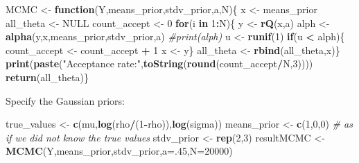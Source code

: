 \documentclass[
  12pt,
]{book}
\newenvironment{Shaded}{\begin{snugshade}}{\end{snugshade}}
\newcommand{\AttributeTok}[1]{\textcolor[rgb]{0.13,0.29,0.53}{#1}}
\newcommand{\CommentTok}[1]{\textcolor[rgb]{0.56,0.35,0.01}{\textit{#1}}}
\newcommand{\ConstantTok}[1]{\textcolor[rgb]{0.56,0.35,0.01}{#1}}
\newcommand{\ControlFlowTok}[1]{\textcolor[rgb]{0.13,0.29,0.53}{\textbf{#1}}}
\newcommand{\DecValTok}[1]{\textcolor[rgb]{0.00,0.00,0.81}{#1}}
\newcommand{\FunctionTok}[1]{\textcolor[rgb]{0.13,0.29,0.53}{\textbf{#1}}}
\newcommand{\NormalTok}[1]{#1}
\newcommand{\OtherTok}[1]{\textcolor[rgb]{0.56,0.35,0.01}{#1}}
\newcommand{\SpecialCharTok}[1]{\textcolor[rgb]{0.81,0.36,0.00}{\textbf{#1}}}
\newcommand{\StringTok}[1]{\textcolor[rgb]{0.31,0.60,0.02}{#1}}
\theoremstyle{definition}
\theoremstyle{definition}
\theoremstyle{definition}
\theoremstyle{definition}
\theoremstyle{remark}
\begin{document}
\begin{Shaded}
\begin{Highlighting}[]
\NormalTok{MCMC }\OtherTok{\textless{}{-}} \ControlFlowTok{function}\NormalTok{(Y,means\_prior,stdv\_prior,a,N)\{}
\NormalTok{  x }\OtherTok{\textless{}{-}}\NormalTok{ means\_prior}
\NormalTok{  all\_theta }\OtherTok{\textless{}{-}} \ConstantTok{NULL}
\NormalTok{  count\_accept }\OtherTok{\textless{}{-}} \DecValTok{0}
  \ControlFlowTok{for}\NormalTok{(i }\ControlFlowTok{in} \DecValTok{1}\SpecialCharTok{:}\NormalTok{N)\{}
\NormalTok{    y }\OtherTok{\textless{}{-}} \FunctionTok{rQ}\NormalTok{(x,a)}
\NormalTok{    alph }\OtherTok{\textless{}{-}} \FunctionTok{alpha}\NormalTok{(y,x,means\_prior,stdv\_prior,a)}
    \CommentTok{\#print(alph)}
\NormalTok{    u }\OtherTok{\textless{}{-}} \FunctionTok{runif}\NormalTok{(}\DecValTok{1}\NormalTok{)}
    \ControlFlowTok{if}\NormalTok{(u }\SpecialCharTok{\textless{}}\NormalTok{ alph)\{}
\NormalTok{      count\_accept }\OtherTok{\textless{}{-}}\NormalTok{ count\_accept }\SpecialCharTok{+} \DecValTok{1}
\NormalTok{      x }\OtherTok{\textless{}{-}}\NormalTok{ y\}}
\NormalTok{    all\_theta }\OtherTok{\textless{}{-}} \FunctionTok{rbind}\NormalTok{(all\_theta,x)\}}
  \FunctionTok{print}\NormalTok{(}\FunctionTok{paste}\NormalTok{(}\StringTok{"Acceptance rate:"}\NormalTok{,}\FunctionTok{toString}\NormalTok{(}\FunctionTok{round}\NormalTok{(count\_accept}\SpecialCharTok{/}\NormalTok{N,}\DecValTok{3}\NormalTok{))))}
  \FunctionTok{return}\NormalTok{(all\_theta)\}}
\end{Highlighting}
\end{Shaded}

Specify the Gaussian priors:

\begin{Shaded}
\begin{Highlighting}[]
\NormalTok{true\_values }\OtherTok{\textless{}{-}} \FunctionTok{c}\NormalTok{(mu,}\FunctionTok{log}\NormalTok{(rho}\SpecialCharTok{/}\NormalTok{(}\DecValTok{1}\SpecialCharTok{{-}}\NormalTok{rho)),}\FunctionTok{log}\NormalTok{(sigma))}
\NormalTok{means\_prior }\OtherTok{\textless{}{-}} \FunctionTok{c}\NormalTok{(}\DecValTok{1}\NormalTok{,}\DecValTok{0}\NormalTok{,}\DecValTok{0}\NormalTok{) }\CommentTok{\# as if we did not know the true values}
\NormalTok{stdv\_prior }\OtherTok{\textless{}{-}} \FunctionTok{rep}\NormalTok{(}\DecValTok{2}\NormalTok{,}\DecValTok{3}\NormalTok{)}
\NormalTok{resultMCMC }\OtherTok{\textless{}{-}} \FunctionTok{MCMC}\NormalTok{(Y,means\_prior,stdv\_prior,}\AttributeTok{a=}\NormalTok{.}\DecValTok{45}\NormalTok{,}\AttributeTok{N=}\DecValTok{20000}\NormalTok{)}
\end{Highlighting}
\end{Shaded}
\end{document}
